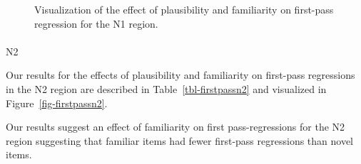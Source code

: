 \documentclass[
  12pt,
  letterpaper,
]{scrreprt}
\makeatletter
\let\oldparagraph\paragraph
\renewcommand{\paragraph}{
    \@ifstar
      \xxxParagraphStar
      \xxxParagraphNoStar
  }
\newcommand{\xxxParagraphStar}[1]{\oldparagraph*{#1}\mbox{}}
\newcommand{\xxxParagraphNoStar}[1]{\oldparagraph{#1}\mbox{}}
\makeatother
\begin{document}
\begin{figure}[htbp]

\caption{\label{fig-firstpassn1staub}Visualization of the effect of
plausibility and familiarity on first-pass regression for the N1
region.}


\end{figure}%

\paragraph{N2}\label{n2-3}

Our results for the effects of plausibility and familiarity on
first-pass regressions in the N2 region are described in
Table~\ref{tbl-firstpassn2} and visualized in
Figure~\ref{fig-firstpassn2}.

Our results suggest an effect of familiarity on first pass-regressions
for the N2 region suggesting that familiar items had fewer first-pass
regressions than novel items.
\end{document}
